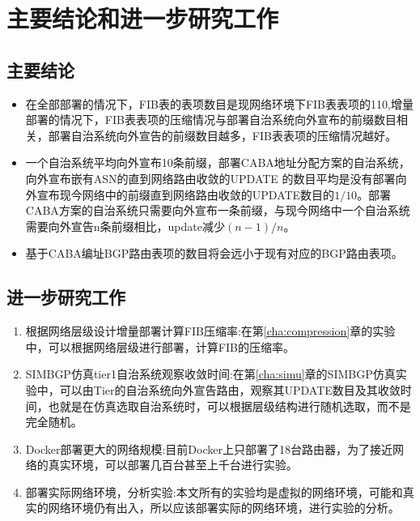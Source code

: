 ﻿

\chapter{主要结论和进一步研究工作}
\section{主要结论}
\begin{itemize}
\item 在全部部署的情况下，FIB表的表项数目是现网络环境下FIB表表项的1\/10,增量部署的情况下，FIB表表项的压缩情况与部署自治系统向外宣布的前缀数目相关，部署自治系统向外宣告的前缀数目越多，FIB表表项的压缩情况越好。
\item 一个自治系统平均向外宣布10条前缀，部署CABA地址分配方案的自治系统，向外宣布嵌有ASN的直到网络路由收敛的UPDATE 的数目平均是没有部署向外宣布现今网络中的前缀直到网络路由收敛的UPDATE数目的$1/10$。部署CABA方案的自治系统只需要向外宣布一条前缀，与现今网络中一个自治系统需要向外宣告n条前缀相比，update减少$(n-1)/n$。
\item 基于CABA编址BGP路由表项的数目将会远小于现有对应的BGP路由表项。
\end{itemize}
\section{进一步研究工作}
\begin{enumerate}
\item 根据网络层级设计增量部署计算FIB压缩率:在第\ref{cha:compression}章的实验中，可以根据网络层级进行部署，计算FIB的压缩率。
\item SIMBGP仿真tier1自治系统观察收敛时间:在第\ref{cha:simu}章的SIMBGP仿真实验中，可以由Tier的自治系统向外宣告路由，观察其UPDATE数目及其收敛时间，也就是在仿真选取自治系统时，可以根据层级结构进行随机选取，而不是完全随机。
\item Docker部署更大的网络规模:目前Docker上只部署了18台路由器，为了接近网络的真实环境，可以部署几百台甚至上千台进行实验。
\item 部署实际网络环境，分析实验:本文所有的实验均是虚拟的网络环境，可能和真实的网络环境仍有出入，所以应该部署实际的网络环境，进行实验的分析。
\end{enumerate}
